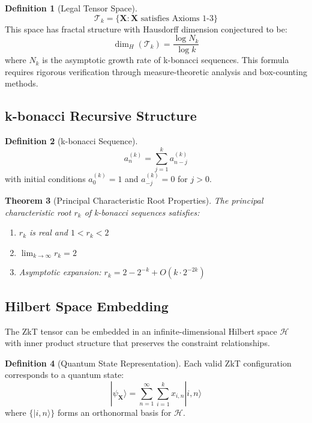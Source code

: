 \documentclass[12pt]{article}
\theoremstyle{plain}
\newtheorem{theorem}{Theorem}[section]
\theoremstyle{definition}
\newtheorem{definition}[theorem]{Definition}
\newcommand{\cH}{\mathcal{H}}
\newcommand{\cT}{\mathcal{T}}
\begin{document}
\begin{definition}[Legal Tensor Space]
\begin{equation}
\cT_k = \{\mathbf{X} : \mathbf{X} \text{ satisfies Axioms 1-3}\}
\end{equation}
This space has fractal structure with Hausdorff dimension conjectured to be:
\begin{equation}
\dim_H(\cT_k) = \frac{\log N_k}{\log k}
\end{equation}
where $N_k$ is the asymptotic growth rate of k-bonacci sequences. This formula requires rigorous verification through measure-theoretic analysis and box-counting methods.
\end{definition}

\subsection{k-bonacci Recursive Structure}

\begin{definition}[k-bonacci Sequence]
\begin{equation}
a_n^{(k)} = \sum_{j=1}^{k} a_{n-j}^{(k)}
\end{equation}
with initial conditions $a_0^{(k)} = 1$ and $a_{-j}^{(k)} = 0$ for $j > 0$.
\end{definition}

\begin{theorem}[Principal Characteristic Root Properties]
The principal characteristic root $r_k$ of k-bonacci sequences satisfies:
\begin{enumerate}
\item $r_k$ is real and $1 < r_k < 2$
\item $\lim_{k \to \infty} r_k = 2$
\item Asymptotic expansion: $r_k = 2 - 2^{-k} + O(k \cdot 2^{-2k})$
\end{enumerate}
\end{theorem}

\subsection{Hilbert Space Embedding}

The ZkT tensor can be embedded in an infinite-dimensional Hilbert space $\cH$ with inner product structure that preserves the constraint relationships.

\begin{definition}[Quantum State Representation]
Each valid ZkT configuration corresponds to a quantum state:
\begin{equation}
|\psi_{\mathbf{X}}\rangle = \sum_{n=1}^{\infty} \sum_{i=1}^k x_{i,n} |i,n\rangle
\end{equation}
where $\{|i,n\rangle\}$ forms an orthonormal basis for $\cH$.
\end{definition}
\end{document}
